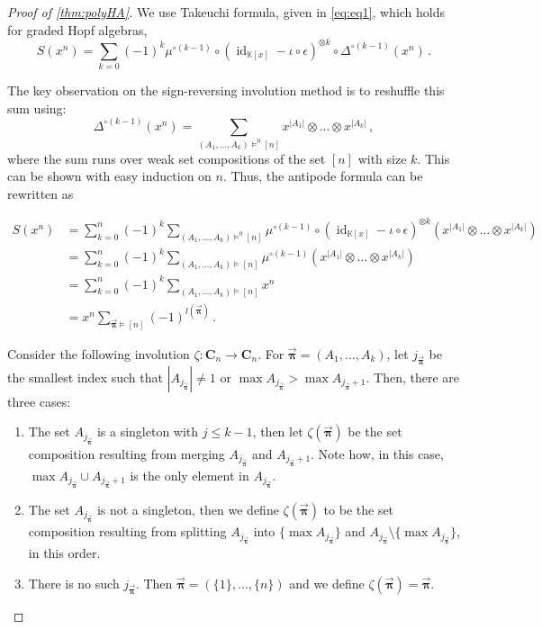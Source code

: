 \documentclass[12pt, reqno]{amsart}
\theoremstyle{definition}
\newcommand{\oPi}{\mathbf{C}}
\newcommand{\opi}{\vec{\boldsymbol{\pi}}}
\DeclareMathOperator{\id}{id}
\begin{document}
\begin{proof}[Proof of \cref{thm:polyHA}]
We use Takeuchi formula, given in \eqref{eq:eq1}, which holds for graded Hopf algebras,
$$S(x^n) = \sum_{k = 0} (-1)^k \mu^{\circ (k-1)} \circ (\id_{\mathbb K[x]} - \iota \circ \epsilon )^{\otimes k} \circ \Delta^{\circ (k-1)} (x^n) \, .$$

The key observation on the sign-reversing involution method is to reshuffle this sum using:
$$ \Delta^{\circ (k-1) } (x^n) = \sum_{(A_1, \dots , A_k) \models^0 [n] } x^{|A_1|} \otimes \dots \otimes x^{|A_k|} \, ,$$
where the sum runs over weak set compositions of the set $[n]$ with size $k$.
This can be shown with easy induction on $n$.
Thus, the antipode formula can be rewritten as

\begin{align*}
S(x^n)&= \sum_{k=0}^n(-1)^k \sum_{(A_1, \dots , A_k) \models^0 [n]} \mu^{\circ (k-1)} \circ (\id_{\mathbb K[x]} - \iota \circ \epsilon )^{\otimes k} (x^{|A_1|} \otimes \dots \otimes x^{|A_k|})   \\
	  &= \sum_{k=0}^n(-1)^k \sum_{(A_1, \dots , A_k) \models [n]} \mu^{\circ (k-1)} (x^{|A_1|} \otimes \dots \otimes x^{|A_k|})   \\
	  &= \sum_{k=0}^n(-1)^k \sum_{(A_1, \dots , A_k) \models [n]} x^n   \\
	  &= x^n \sum_{\opi \models [n]} (-1)^{l(\opi)}\, .
\end{align*}

Consider the following involution $\zeta: \oPi_{n} \to \oPi_{n} $.
For $\opi = (A_1, \dots , A_k) $, let $j_{\opi}$ be the smallest index such that $|A_{j_{\opi}}| \neq 1$ or $\max A_{j_{\opi}} > \max A_{j_{\opi}+1} $.
Then, there are three cases:

\begin{enumerate}

\item The set $A_{j_{\opi}} $ is a singleton with $j\leq k-1$, then let $\zeta(\opi ) $ be the set composition resulting from merging $A_{j_{\opi}} $ and $A_{j_{\opi}+1}$.
Note how, in this case, $\max A_{j_{\opi}} \cup A_{j_{\opi} + 1} $ is the only element in $A_{j_{\opi}}$.

\item The set $A_{j_{\opi}} $ is not a singleton, then we define $\zeta(\opi ) $ to be the set composition resulting from splitting $A_{j_{\opi}} $ into $\{ \max A_{j_{\opi}} \} $ and $A_{j_{\opi}} \setminus \{\max A_{j_{\opi}} \}$, in this order.

\item There is no such $j_{\opi}$. Then $\opi = (\{1\}, \dots , \{n\})$ and we define $\zeta(\opi )= \opi $.


\end{enumerate}
\end{proof}
\end{document}
